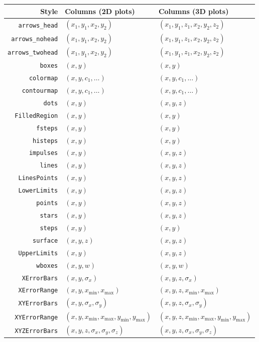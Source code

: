 \begin{table}
\begin{tabular}{|rll|}
\hline
{\bf Style} & {\bf Columns (2D plots)} & {\bf Columns (3D plots)} \\
\hline
{\tt arrows\_head} & $(x_1,y_1,x_2,y_2)$ & $(x_1,y_1,z_1,x_2,y_2,z_2)$ \\
{\tt arrows\_nohead} & $(x_1,y_1,x_2,y_2)$ & $(x_1,y_1,z_1,x_2,y_2,z_2)$ \\
{\tt arrows\_twohead} & $(x_1,y_1,x_2,y_2)$ & $(x_1,y_1,z_1,x_2,y_2,z_2)$ \\
{\tt boxes} & $(x,y)$ & $(x,y)$ \\
{\tt colormap} & $(x,y,c_1,\ldots)$ & $(x,y,c_1,\ldots)$ \\
{\tt contourmap} & $(x,y,c_1,\ldots)$ & $(x,y,c_1,\ldots)$ \\
{\tt dots} & $(x,y)$ & $(x,y,z)$ \\
{\tt FilledRegion} & $(x,y)$ & $(x,y)$ \\
{\tt fsteps} & $(x,y)$ & $(x,y)$ \\
{\tt histeps} & $(x,y)$ & $(x,y)$ \\
{\tt impulses} & $(x,y)$ & $(x,y,z)$ \\
{\tt lines} & $(x,y)$ & $(x,y,z)$ \\
{\tt LinesPoints} & $(x,y)$ & $(x,y,z)$ \\
{\tt LowerLimits} & $(x,y)$ & $(x,y,z)$ \\
{\tt points} & $(x,y)$ & $(x,y,z)$ \\
{\tt stars} & $(x,y)$ & $(x,y,z)$ \\
{\tt steps} & $(x,y)$ & $(x,y)$ \\
{\tt surface} & $(x,y,z)$ & $(x,y,z)$ \\
{\tt UpperLimits} & $(x,y)$ & $(x,y,z)$ \\
{\tt wboxes} & $(x,y,w)$ & $(x,y,w)$ \\
{\tt XErrorBars} & $(x,y,\sigma_x)$ & $(x,y,z,\sigma_x)$ \\
{\tt XErrorRange} & $(x,y,x_\mathrm{min},x_\mathrm{max})$ & $(x,y,z,x_\mathrm{min},x_\mathrm{max})$ \\
{\tt XYErrorBars} & $(x,y,\sigma_x,\sigma_y)$ & $(x,y,z,\sigma_x,\sigma_y)$ \\
{\tt XYErrorRange} & $(x,y,x_\mathrm{min},x_\mathrm{max},y_\mathrm{min},y_\mathrm{max})$ & $(x,y,z,x_\mathrm{min},x_\mathrm{max},y_\mathrm{min},y_\mathrm{max})$ \\
{\tt XYZErrorBars} & $(x,y,z,\sigma_x,\sigma_y,\sigma_z)$ & $(x,y,z,\sigma_x,\sigma_y,\sigma_z)$ \\

\end{tabular}
\end{table}
